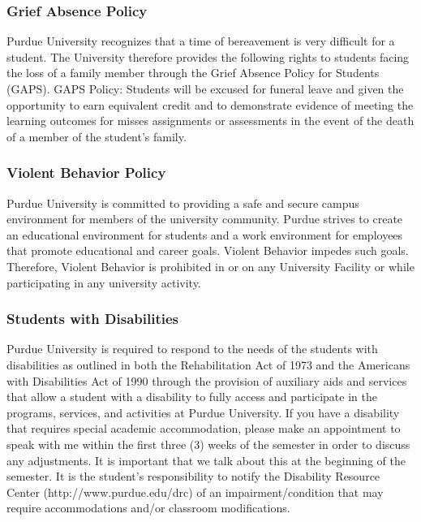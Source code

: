 \documentclass{article}
\begin{document}
\hypertarget{grief_absence_policy_23}{}\subsubsection*{{Grief Absence Policy}}\label{grief_absence_policy_23}

Purdue University recognizes that a time of bereavement is very difficult for a student. The University therefore provides the following rights to students facing the loss of a family member through the Grief Absence Policy for Students (GAPS). GAPS Policy: Students will be excused for funeral leave and given the opportunity to earn equivalent credit and to demonstrate evidence of meeting the learning outcomes for misses assignments or assessments in the event of the death of a member of the student'{}s family.

\hypertarget{violent_behavior_policy_24}{}\subsubsection*{{Violent Behavior Policy}}\label{violent_behavior_policy_24}

Purdue University is committed to providing a safe and secure campus environment for members of the university community. Purdue strives to create an educational environment for students and a work environment for employees that promote educational and career goals. Violent Behavior impedes such goals. Therefore, Violent Behavior is prohibited in or on any University Facility or while participating in any university activity.

\hypertarget{students_with_disabilities_25}{}\subsubsection*{{Students with Disabilities}}\label{students_with_disabilities_25}

Purdue University is required to respond to the needs of the students with disabilities as outlined in both the Rehabilitation Act of 1973 and the Americans with Disabilities Act of 1990 through the provision of auxiliary aids and services that allow a student with a disability to fully access and participate in the programs, services, and activities at Purdue University. If you have a disability that requires special academic accommodation, please make an appointment to speak with me within the first three (3) weeks of the semester in order to discuss any adjustments. It is important that we talk about this at the beginning of the semester. It is the student'{}s responsibility to notify the Disability Resource Center (http://www.purdue.edu/drc) of an impairment/condition that may require accommodations and/or classroom modifications.
\end{document}
